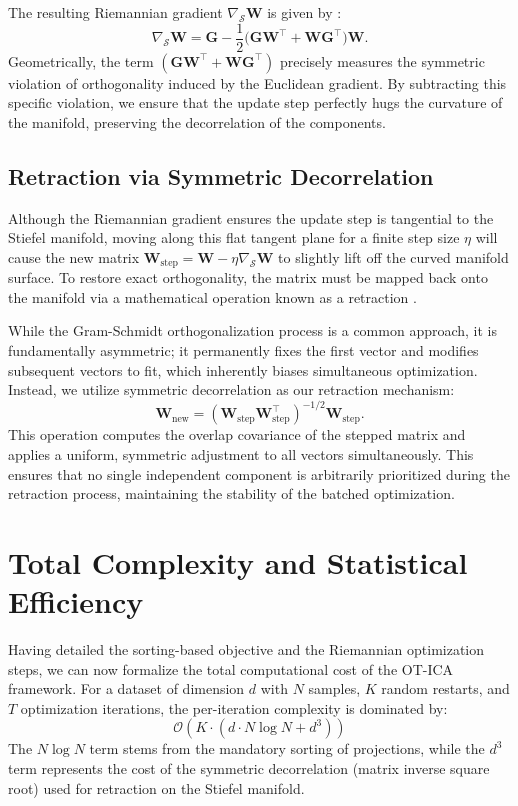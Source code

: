 \documentclass[12pt,a4paper,twoside,openany]{book}
\begin{document}
The resulting Riemannian gradient $\nabla_{\mathcal{S}} \mathbf{W}$ is given by \cite[Chapter 3]{absil2008optimization}:
\begin{equation}
    \nabla_{\mathcal{S}} \mathbf{W} = \mathbf{G} - \frac{1}{2}\big(\mathbf{G}\mathbf{W}^\top + \mathbf{W}\mathbf{G}^\top \big)\mathbf{W}.
\end{equation}
Geometrically, the term $(\mathbf{G}\mathbf{W}^\top + \mathbf{W}\mathbf{G}^\top)$ precisely measures the symmetric violation of orthogonality induced by the Euclidean gradient. 
By subtracting this specific violation, we ensure that the update step perfectly hugs the curvature of the manifold, preserving the decorrelation of the components.

\subsection{Retraction via Symmetric Decorrelation}
Although the Riemannian gradient ensures the update step is tangential to the Stiefel manifold, 
moving along this flat tangent plane for a finite step size $\eta$ will cause the new matrix $\mathbf{W}_{\text{step}} = \mathbf{W} - \eta \nabla_{\mathcal{S}} \mathbf{W}$ 
to slightly lift off the curved manifold surface. To restore exact orthogonality, the matrix must be mapped back onto the manifold 
via a mathematical operation known as a retraction \cite[Chapter 4]{absil2008optimization}.

While the Gram-Schmidt orthogonalization process is a common approach, it is fundamentally asymmetric; 
it permanently fixes the first vector and modifies subsequent vectors to fit, which inherently biases simultaneous optimization. 
Instead, we utilize symmetric decorrelation as our retraction mechanism:
\begin{equation}
    \mathbf{W}_{\text{new}} = (\mathbf{W}_{\text{step}}\mathbf{W}_{\text{step}}^\top)^{-1/2} \mathbf{W}_{\text{step}}.
\end{equation}
This operation computes the overlap covariance of the stepped matrix and applies a uniform, symmetric adjustment to all vectors simultaneously. 
This ensures that no single independent component is arbitrarily prioritized during the retraction process, maintaining the stability of the batched optimization.

\section{Total Complexity and Statistical Efficiency}
Having detailed the sorting-based objective and the Riemannian optimization steps, we can now formalize the total computational cost of the OT-ICA framework. 
For a dataset of dimension $d$ with $N$ samples, $K$ random restarts, and $T$ optimization iterations, the per-iteration complexity is dominated by:
\begin{equation}
    \mathcal{O}(K \cdot (d \cdot N \log N + d^3))
\end{equation}
The $N \log N$ term stems from the mandatory sorting of projections, while the $d^3$ term represents the cost of the symmetric decorrelation (matrix inverse square root) 
used for retraction on the Stiefel manifold.
\end{document}
